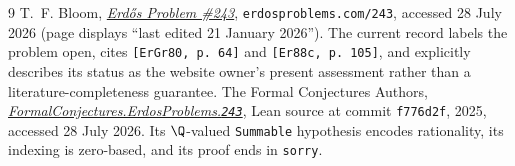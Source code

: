 \documentclass[11pt]{article}
\begin{document}
\begin{thebibliography}{9}
 T.~F. Bloom,
  \href{https://www.erdosproblems.com/243}{\emph{Erd\H{o}s Problem \#243}},
  \texttt{erdosproblems.com/243}, accessed 28 July 2026 (page displays
  ``last edited 21 January 2026'').  The current record labels the problem
  open, cites \texttt{[ErGr80, p.~64]} and \texttt{[Er88c, p.~105]}, and
  explicitly describes its status as the website owner's present assessment
  rather than a literature-completeness guarantee.
 The Formal Conjectures Authors,
  \href{https://github.com/google-deepmind/formal-conjectures/blob/f776d2f2039351b00737ffcafb9d7d7666e1d9af/FormalConjectures/ErdosProblems/243.lean}
  {\emph{FormalConjectures.ErdosProblems.\texttt{243}}},
  Lean source at commit \texttt{f776d2f}, 2025, accessed 28 July 2026.
  Its $\Q$-valued \texttt{Summable} hypothesis encodes rationality, its
  indexing is zero-based, and its proof ends in \texttt{sorry}.
\end{thebibliography}
\end{document}

